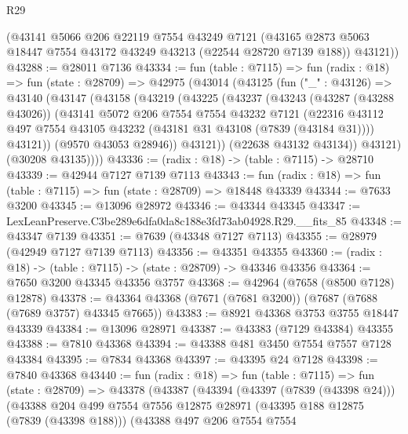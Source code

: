\begin{lexlean}{R29}
\begin{coremodule}
      (@43141
        @5066
        @206
        @22119
        @7554
        @43249
        @7121
        (@43165 @2873 @5063 @18447 @7554 @43172 @43249 @43213 (@22544 @28720 @7139 @188))
        @43121))
@43288 := @28011 @7136
@43334 := fun (table : @7115) =>
  fun (radix : @18) =>
  fun (state : @28709) =>
  @42975
    (@43014
      (@43125
        (fun ("_" : @43126) =>
        @43140
          (@43147
            (@43158
              (@43219
                (@43225
                  (@43237
                    (@43243
                      (@43287 (@43288 @43026))
                      (@43141
                        @5072
                        @206
                        @7554
                        @7554
                        @43232
                        @7121
                        (@22316
                          @43112
                          @497
                          @7554
                          @43105
                          @43232
                          (@43181 @31 @43108 (@7839 (@43184 @31))))
                        @43121))
                    (@9570 @43053 @28946))
                  @43121))
              (@22638 @43132 @43134))
            @43121)
          (@30208 @43135))))
@43336 := (radix : @18) -> (table : @7115) -> @28710
@43339 := @42944 @7127 @7139 @7113
@43343 := fun (radix : @18) => fun (table : @7115) => fun (state : @28709) => @18448 @43339
@43344 := @7633 @3200
@43345 := @13096 @28972
@43346 := @43344 @43345
@43347 := LexLeanPreserve.C3be289e6dfa0da8c188e3fd73ab04928.R29.__fits_85
@43348 := @43347 @7139
@43351 := @7639 (@43348 @7127 @7113)
@43355 := @28979 (@42949 @7127 @7139 @7113)
@43356 := @43351 @43355
@43360 := (radix : @18) -> (table : @7115) -> (state : @28709) -> @43346 @43356
@43364 := @7650 @3200 @43345 @43356 @3757
@43368 := @42964 (@7658 (@8500 @7128) @12878)
@43378 := @43364 @43368 (@7671 (@7681 @3200)) (@7687 (@7688 (@7689 @3757) @43345 @7665))
@43383 := @8921 @43368 @3753 @3755 @18447 @43339
@43384 := @13096 @28971
@43387 := @43383 (@7129 @43384) @43355
@43388 := @7810 @43368
@43394 := @43388 @481 @3450 @7554 @7557 @7128 @43384
@43395 := @7834 @43368
@43397 := @43395 @24 @7128
@43398 := @7840 @43368
@43440 := fun (radix : @18) =>
  fun (table : @7115) =>
  fun (state : @28709) =>
  @43378
    (@43387
      (@43394
        (@43397 (@7839 (@43398 @24)))
        (@43388
          @204
          @499
          @7554
          @7556
          @12875
          @28971
          (@43395 @188 @12875 (@7839 (@43398 @188)))
          (@43388
            @497
            @206
            @7554
            @7554

\end{coremodule}
\end{lexlean}
